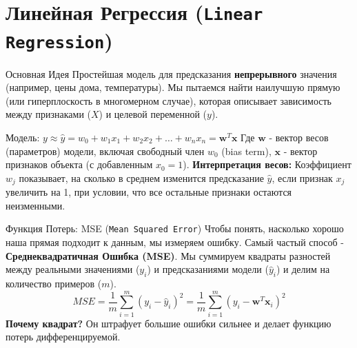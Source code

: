 
\section{Линейная Регрессия (\texttt{Linear Regression})}

\begin{textbox}{Основная Идея}
Простейшая модель для предсказания \textbf{непрерывного} значения (например, цены дома, температуры). Мы пытаемся найти наилучшую прямую (или гиперплоскость в многомерном случае), которая описывает зависимость между признаками ($X$) и целевой переменной ($y$).

Модель: $y \approx \hat{y} = w_0 + w_1 x_1 + w_2 x_2 + \dots + w_n x_n = \mathbf{w}^T \mathbf{x}$
Где $\mathbf{w}$ - вектор весов (параметров) модели, включая свободный член $w_0$ (bias term), $\mathbf{x}$ - вектор признаков объекта (с добавленным $x_0=1$).
\textbf{Интерпретация весов:} Коэффициент $w_j$ показывает, на сколько в среднем изменится предсказание $\hat{y}$, если признак $x_j$ увеличить на 1, при условии, что все остальные признаки остаются неизменными.
\end{textbox}

\begin{myblock}{Функция Потерь: MSE (\texttt{Mean Squared Error})}
Чтобы понять, насколько хорошо наша прямая подходит к данным, мы измеряем ошибку. Самый частый способ - \textbf{Среднеквадратичная Ошибка (MSE)}. Мы суммируем квадраты разностей между реальными значениями ($y_i$) и предсказаниями модели ($\hat{y}_i$) и делим на количество примеров ($m$).
\[
MSE = \frac{1}{m} \sum_{i=1}^{m} (y_i - \hat{y}_i)^2 = \frac{1}{m} \sum_{i=1}^{m} (y_i - \mathbf{w}^T \mathbf{x}_i)^2
\]
\textbf{Почему квадрат?} Он штрафует большие ошибки сильнее и делает функцию потерь дифференцируемой.
\end{myblock}

